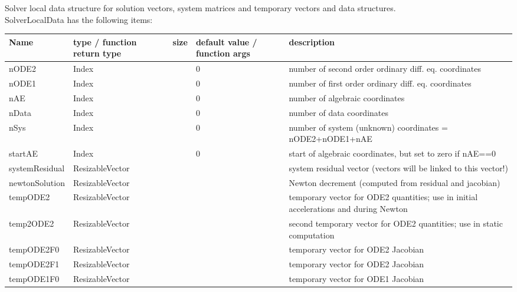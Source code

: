  \label{sec:SolverLocalData}
Solver local data structure for solution vectors, system matrices and temporary vectors and data structures.\\ 
%
SolverLocalData has the following items:
\begin{center}
  \footnotesize
  \begin{longtable}{| p{4.2cm} | p{2.5cm} | p{0.3cm} | p{3.0cm} | p{6cm} |}
    \hline
    \bf Name & \bf type / function return type & \bf size & \bf default value / function args & \bf description \\ \hline
    nODE2 &     Index &      &     0 &     number of second order ordinary diff. eq. coordinates\\ \hline
    nODE1 &     Index &      &     0 &     number of first order ordinary diff. eq. coordinates\\ \hline
    nAE &     Index &      &     0 &     number of algebraic coordinates\\ \hline
    nData &     Index &      &     0 &     number of data coordinates\\ \hline
    nSys &     Index &      &     0 &     number of system (unknown) coordinates = nODE2+nODE1+nAE\\ \hline
    startAE &     Index &      &     0 &     start of algebraic coordinates, but set to zero if nAE==0\\ \hline
    systemResidual &     ResizableVector &      &      &     system residual vector (vectors will be linked to this vector!)\\ \hline
    newtonSolution &     ResizableVector &      &      &     Newton decrement (computed from residual and jacobian)\\ \hline
    tempODE2 &     ResizableVector &      &      &     temporary vector for ODE2 quantities; use in initial accelerations and during Newton\\ \hline
    temp2ODE2 &     ResizableVector &      &      &     second temporary vector for ODE2 quantities; use in static computation\\ \hline
    tempODE2F0 &     ResizableVector &      &      &     temporary vector for ODE2 Jacobian\\ \hline
    tempODE2F1 &     ResizableVector &      &      &     temporary vector for ODE2 Jacobian\\ \hline
    tempODE1F0 &     ResizableVector &      &      &     temporary vector for ODE1 Jacobian\\ \hline

\end{longtable}
\end{center}

